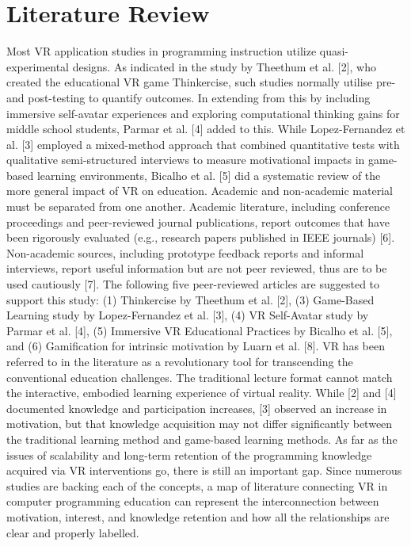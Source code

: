 \documentclass[conference]{IEEEtran}
\begin{document}
\section{Literature Review}
Most VR application studies in programming instruction utilize quasi-experimental designs. As indicated in the study by Theethum et al. [2], who created the educational VR game Thinkercise, such studies normally utilise pre- and post-testing to quantify outcomes. In extending from this by including immersive self-avatar experiences and exploring computational thinking gains for middle school students, Parmar et al. [4] added to this. While Lopez-Fernandez et al. [3] employed a mixed-method approach that combined quantitative tests with qualitative semi-structured interviews to measure motivational impacts in game-based learning environments, Bicalho et al. [5] did a systematic review of the more general impact of VR on education. 
Academic and non-academic material must be separated from one another. Academic literature, including conference proceedings and peer-reviewed journal publications, report outcomes that have been rigorously evaluated (e.g., research papers published in IEEE journals) [6]. Non-academic sources, including prototype feedback reports and informal interviews, report useful information but are not peer reviewed, thus are to be used cautiously [7]. 
The following five peer-reviewed articles are suggested to support this study: (1) Thinkercise by Theethum et al. [2], (3) Game-Based Learning study by Lopez-Fernandez et al. [3], (4) VR Self-Avatar study by Parmar et al. [4], (5) Immersive VR Educational Practices by Bicalho et al. [5], and (6) Gamification for intrinsic motivation by Luarn et al. [8]. 
VR has been referred to in the literature as a revolutionary tool for transcending the conventional education challenges. The traditional lecture format cannot match the interactive, embodied learning experience of virtual reality. While [2] and [4] documented knowledge and participation increases, [3] observed an increase in motivation, but that knowledge acquisition may not differ significantly between the traditional learning method and game-based learning methods. As far as the issues of scalability and long-term retention of the programming knowledge acquired via VR interventions go, there is still an important gap. 
Since numerous studies are backing each of the concepts, a map of literature connecting VR in computer programming education can represent the interconnection between motivation, interest, and knowledge retention and how all the relationships are clear and properly labelled. 
\end{document}
